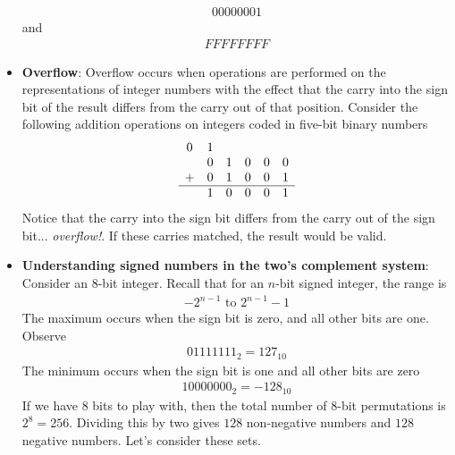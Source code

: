 \documentclass{report}
\begin{document}
\begin{itemize}
            \begin{align*}
                00000001
            \end{align*}
            and 
            \begin{align*}
                FFFFFFFF
            \end{align*}
        \item \textbf{Overflow}: Overflow occurs when operations are performed on the representations of integer numbers with the effect that the carry into the sign bit of the result differs from the carry out of that position. Consider the following addition operations on integers coded in five-bit binary numbers
            \begin{align*}
                \begin{array}{cccccc}
                    0&1&&&& \\
                    &0&1&0&0&0\\
                    +&0&1&0&0&1 \\
                    \hline 
                     &1&0&0&0&1
                \end{array}
            \end{align*}
            Notice that the carry into the sign bit differs from the carry out of the sign bit... \textit{overflow!}. If these carries matched, the result would be valid.
        \item \textbf{Understanding signed numbers in the two's complement system}: Consider an 8-bit integer. Recall that for an $n$-bit signed integer, the range is
            \begin{align*}
                -2^{n-1} \text{ to } 2^{n-1}-1
            \end{align*}
            The maximum occurs when the sign bit is zero, and all other bits are one. Observe
            \begin{align*}
                01111111_{2} = 127_{10}
            \end{align*}
            The minimum occurs when the sign bit is one and all other bits are zero
            \begin{align*}
                10000000_{2} = -128_{10}
            \end{align*}
            If we have $8$ bits to play with, then the total number of 8-bit permutations is $2^{8} = 256$. Dividing this by two gives $128$ non-negative numbers and $128$ negative numbers. Let's consider these sets. 
            \begin{align*}

\end{align*}
\end{itemize}
\end{document}
